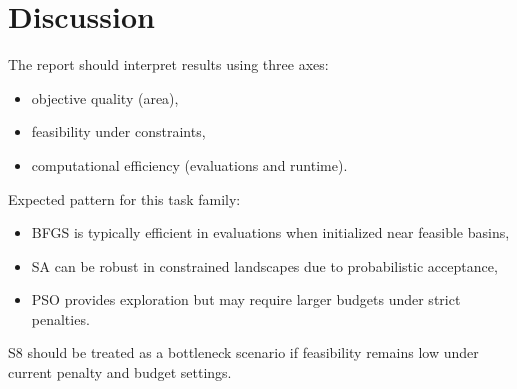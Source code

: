 \chapter{Discussion}

The report should interpret results using three axes:
\begin{itemize}[leftmargin=1.5em]
\item objective quality (area),
\item feasibility under constraints,
\item computational efficiency (evaluations and runtime).
\end{itemize}

Expected pattern for this task family:
\begin{itemize}[leftmargin=1.5em]
\item BFGS is typically efficient in evaluations when initialized near feasible basins,
\item SA can be robust in constrained landscapes due to probabilistic acceptance,
\item PSO provides exploration but may require larger budgets under strict penalties.
\end{itemize}

S8 should be treated as a bottleneck scenario if feasibility remains low under current penalty and budget settings.
